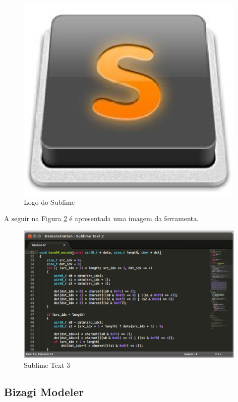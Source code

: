 \begin{figure}[!h]
	\centering
	\includegraphics[scale=0.35]{figuras/capitulo3/logo_sublime.eps}
	\caption{Logo do Sublime}
	\label{logo_sublime}
\end{figure}

A seguir na Figura \ref{sublime} é apresentada uma imagem da ferramenta.

\begin{figure}[!h]
	\centering
	\includegraphics[scale=0.35]{figuras/capitulo3/sublime.eps}
	\caption{Sublime Text 3}
	\label{sublime}
\end{figure}

\subsection{Bizagi Modeler}

